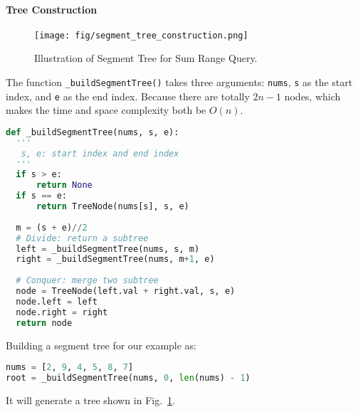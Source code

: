 \documentclass[main.tex]{subfiles}
\begin{document}
\paragraph{Tree Construction}
\begin{figure}[h]
    \centering
    \texttt{[image: fig/segment\_tree\_construction.png]}
    \caption{Illustration of Segment Tree for Sum Range Query. }
    \label{fig:segment_tree_construction}
\end{figure}
The function \texttt{\_buildSegmentTree()} takes three arguments: \texttt{nums}, \texttt{s} as the start index, and \texttt{e} as the end index. Because there are totally $2n-1$ nodes, which makes the time and space complexity both be $O(n)$.
\begin{lstlisting}[language=Python]
def _buildSegmentTree(nums, s, e):
  '''
   s, e: start index and end index
  '''
  if s > e:
      return None
  if s == e:
      return TreeNode(nums[s], s, e)
  
  m = (s + e)//2
  # Divide: return a subtree 
  left = _buildSegmentTree(nums, s, m)
  right = _buildSegmentTree(nums, m+1, e)
  
  # Conquer: merge two subtree
  node = TreeNode(left.val + right.val, s, e)
  node.left = left
  node.right = right
  return node
\end{lstlisting}
Building a segment tree for our example as:
\begin{lstlisting}[language=Python]
nums = [2, 9, 4, 5, 8, 7]
root = _buildSegmentTree(nums, 0, len(nums) - 1)
\end{lstlisting}
It will generate a tree shown in Fig.~\ref{fig:segment_tree_construction}. 
\end{document}
